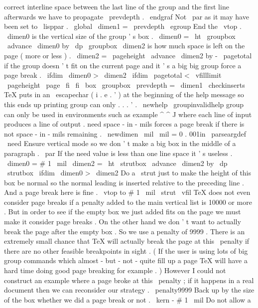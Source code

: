 {{correct
interline
space
between
the
last
line
of
the
group
%
and
the
first
line
afterwards
we
have
to
propagate
\
prevdepth
.
\
endgraf
%
Not
\
par
as
it
may
have
been
set
to
\
lisppar
.
\
global
\
dimen1
=
\
prevdepth
\
egroup
%
End
the
\
vtop
.
%
\
dimen0
is
the
vertical
size
of
the
group
'
s
box
.
\
dimen0
=
\
ht
\
groupbox
\
advance
\
dimen0
by
\
dp
\
groupbox
%
\
dimen2
is
how
much
space
is
left
on
the
page
(
more
or
less
)
.
\
dimen2
=
\
pageheight
\
advance
\
dimen2
by
-
\
pagetotal
%
if
the
group
doesn
'
t
fit
on
the
current
page
and
it
'
s
a
big
big
%
group
force
a
page
break
.
\
ifdim
\
dimen0
>
\
dimen2
\
ifdim
\
pagetotal
<
\
vfilllimit
\
pageheight
\
page
\
fi
\
fi
\
box
\
groupbox
\
prevdepth
=
\
dimen1
\
checkinserts
}
%
%
TeX
puts
in
an
\
escapechar
(
i
.
e
.
'
)
at
the
beginning
of
the
help
%
message
so
this
ends
up
printing
group
can
only
.
.
.
'
.
%
\
newhelp
\
groupinvalidhelp
{
%
group
can
only
be
used
in
environments
such
as
example
^
^
J
%
where
each
line
of
input
produces
a
line
of
output
.
}
%
need
space
-
in
-
mils
%
forces
a
page
break
if
there
is
not
space
-
in
-
mils
remaining
.
\
newdimen
\
mil
\
mil
=
0
.
001in
\
parseargdef
\
need
{
%
%
Ensure
vertical
mode
so
we
don
'
t
make
a
big
box
in
the
middle
of
a
%
paragraph
.
\
par
%
%
If
the
need
value
is
less
than
one
line
space
it
'
s
useless
.
\
dimen0
=
#
1
\
mil
\
dimen2
=
\
ht
\
strutbox
\
advance
\
dimen2
by
\
dp
\
strutbox
\
ifdim
\
dimen0
>
\
dimen2
%
%
Do
a
\
strut
just
to
make
the
height
of
this
box
be
normal
so
the
%
normal
leading
is
inserted
relative
to
the
preceding
line
.
%
And
a
page
break
here
is
fine
.
\
vtop
to
#
1
\
mil
{
\
strut
\
vfil
}
%
%
%
TeX
does
not
even
consider
page
breaks
if
a
penalty
added
to
the
%
main
vertical
list
is
10000
or
more
.
But
in
order
to
see
if
the
%
empty
box
we
just
added
fits
on
the
page
we
must
make
it
consider
%
page
breaks
.
On
the
other
hand
we
don
'
t
want
to
actually
break
the
%
page
after
the
empty
box
.
So
we
use
a
penalty
of
9999
.
%
%
There
is
an
extremely
small
chance
that
TeX
will
actually
break
the
%
page
at
this
\
penalty
if
there
are
no
other
feasible
breakpoints
in
%
sight
.
(
If
the
user
is
using
lots
of
big
group
commands
which
%
almost
-
but
-
not
-
quite
fill
up
a
page
TeX
will
have
a
hard
time
doing
%
good
page
breaking
for
example
.
)
However
I
could
not
construct
an
%
example
where
a
page
broke
at
this
\
penalty
;
if
it
happens
in
a
real
%
document
then
we
can
reconsider
our
strategy
.
\
penalty9999
%
%
Back
up
by
the
size
of
the
box
whether
we
did
a
page
break
or
not
.
\
kern
-
#
1
\
mil
%
%
Do
not
allow
a
}}
